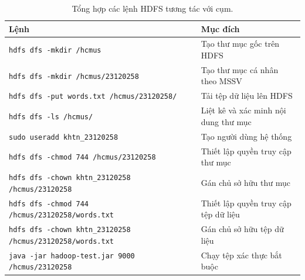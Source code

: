 \begin{table}[H]
\centering
\caption{Tổng hợp các lệnh HDFS tương tác với cụm.}
\label{tab:hdfs-commands}
\begin{tabularx}{\textwidth}{lX}
\toprule
\textbf{Lệnh} & \textbf{Mục đích} \\
\midrule
\texttt{hdfs dfs -mkdir /hcmus} & Tạo thư mục gốc trên HDFS \\
\texttt{hdfs dfs -mkdir /hcmus/23120258} & Tạo thư mục cá nhân theo MSSV \\
\texttt{hdfs dfs -put words.txt /hcmus/23120258/} & Tải tệp dữ liệu lên HDFS \\
\texttt{hdfs dfs -ls /hcmus/} & Liệt kê và xác minh nội dung thư mục \\
\texttt{sudo useradd khtn\_23120258} & Tạo người dùng hệ thống \\
\texttt{hdfs dfs -chmod 744 /hcmus/23120258} & Thiết lập quyền truy cập thư mục \\
\texttt{hdfs dfs -chown khtn\_23120258 /hcmus/23120258} & Gán chủ sở hữu thư mục \\
\texttt{hdfs dfs -chmod 744 /hcmus/23120258/words.txt} & Thiết lập quyền truy cập tệp dữ liệu \\
\texttt{hdfs dfs -chown khtn\_23120258 /hcmus/23120258/words.txt} & Gán chủ sở hữu tệp dữ liệu \\
\texttt{java -jar hadoop-test.jar 9000 /hcmus/23120258} & Chạy tệp xác thực bắt buộc \\
\bottomrule
\end{tabularx}
\end{table}

